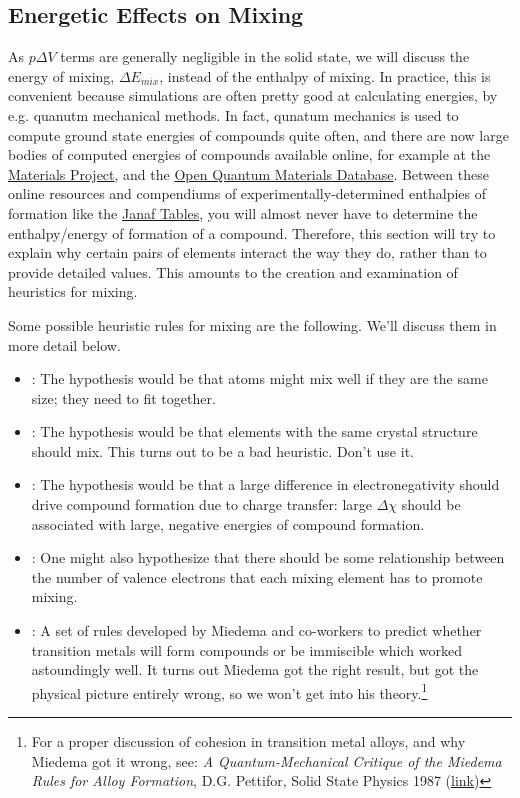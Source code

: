 \documentclass[12pt]{article}
\begin{document}
\subsection{Energetic Effects on Mixing}
As $p \Delta V$ terms are generally negligible in the solid state, we will discuss the energy of mixing, $\Delta E_{mix}$, instead of the enthalpy of mixing. In practice, this is convenient because simulations are often pretty good at calculating energies, by e.g. quanutm mechanical methods. In fact, qunatum mechanics is used to compute ground state energies of compounds quite often, and there are now large bodies of computed energies of compounds available online, for example at the \href{https://www.materialsproject.org/}{Materials Project}, and the \href{http://oqmd.org/}{Open Quantum Materials Database}. Between these online resources and compendiums of experimentally-determined enthalpies of formation like the \href{http://kinetics.nist.gov/janaf/}{Janaf Tables}, you will almost never have to determine the enthalpy/energy of formation of a compound. Therefore, this section will try to explain why certain pairs of elements interact the way they do, rather than to provide detailed values. This amounts to the creation and examination of heuristics for mixing.

Some possible heuristic rules for mixing are the following. We'll discuss them in more detail below.
\begin{itemize}
\item {}: The hypothesis would be that atoms might mix well if they are the same size; they need to fit together.
\item {}: The hypothesis would be that elements with the same crystal structure should mix. This turns out to be a bad heuristic. Don't use it.
\item {}: The hypothesis would be that a large difference in electronegativity should drive compound formation due to charge transfer: large $\Delta \chi$ should be associated with large, negative energies of compound formation.
\item {}: One might also hypothesize that there should be some relationship between the number of valence electrons that each mixing element has to promote mixing.
\item {}: A set of rules developed by Miedema and co-workers to predict whether transition metals will form compounds or be immiscible which worked astoundingly well. It turns out Miedema got the right result, but got the physical picture entirely wrong, so we won't get into his theory.\footnote{For a proper discussion of cohesion in transition metal alloys, and why Miedema got it wrong, see: \textit{A Quantum-Mechanical Critique of the Miedema Rules for Alloy Formation}, D.G. Pettifor, Solid State Physics  1987 (\href{http://libraries.mit.edu/get/ssp}{link})} 
\end{itemize}
\end{document}
